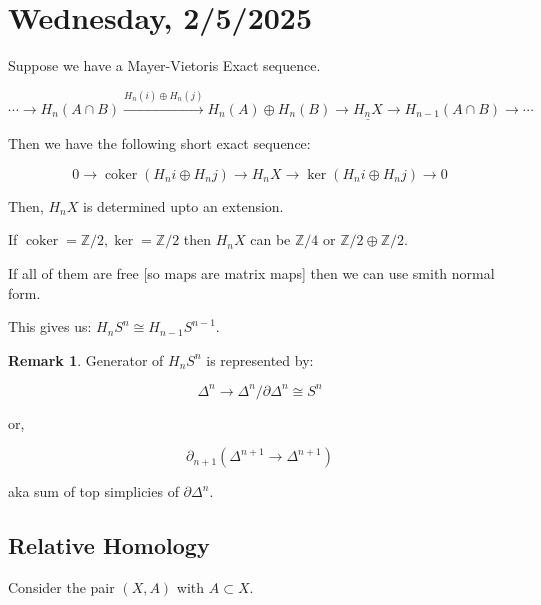 \documentclass{article}
\theoremstyle{definition}
\newtheorem*{remark}{Remark}
\begin{document}
    \section*{Wednesday, 2/5/2025}
    
    Suppose we have a Mayer-Vietoris Exact sequence.

    \[
        \cdots \to H_n (A \cap B) \xrightarrow{H_n(i) \oplus H_n(j)} H_n(A) \oplus H_n(B) \to \underline{H_n X} \to H_{n-1} (A\cap B) \to \cdots  
    \]

    Then we have the following short exact sequence:

    \[
        0 \to \operatorname{coker} (H_n i \oplus H_n j) \to H_n X \to \ker (H_n i \oplus H_n j) \to 0
    \]

    Then, \(H_n X\) is determined upto an extension.

    If \(\operatorname{coker} = \mathbb{Z} / 2, \ker = \mathbb{Z} / 2\) then \(H_n X\) can be \(\mathbb{Z} / 4\) or \(\mathbb{Z} / 2 \oplus \mathbb{Z} / 2\).

    If all of them are free [so maps are matrix maps] then we can use smith normal form.

    This gives us: \(H_n S^n \cong H_{n-1} S^{n-1}\).

    \begin{remark}
        Generator of \(H_n S^n\) is represented by:

        \[
            \Delta^n \to \Delta^n / \partial \Delta^n \cong S^n
        \]

        or,

        \[
            \partial_{n+1} ( \Delta^{n+1} \to \Delta^{n+1})
        \]

        aka sum of top simplicies of \(\partial \Delta^n\).
    \end{remark}

    \subsection*{Relative Homology}

    Consider the pair \((X,A)\) with \(A \subset X\).
\end{document}

